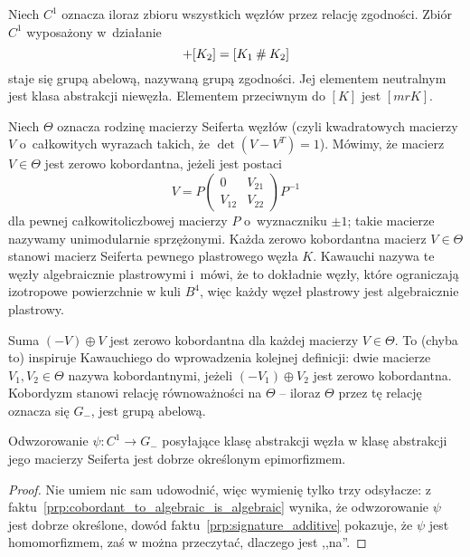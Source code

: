 \begin{definition}
%
    Niech $C^1$ oznacza iloraz zbioru wszystkich węzłów przez relację zgodności.
    Zbiór $C^1$ wyposażony w~działanie
    \begin{equation}
        [K_1] + [K_2] = [K_1 \shrap K_2]
    \end{equation}
    staje się grupą abelową, nazywaną grupą zgodności.
    Jej elementem neutralnym jest klasa abstrakcji niewęzła.
    Elementem przeciwnym do $[K]$ jest $[mr K]$.
\end{definition}


Niech $\Theta$ oznacza rodzinę macierzy Seiferta węzłów (czyli kwadratowych macierzy $V$ o~całkowitych wyrazach takich, że $\det (V - V^T) = 1$).
Mówimy, że macierz $V \in \Theta$ jest zerowo kobordantna, jeżeli jest postaci
\begin{equation}
    V = P \begin{pmatrix} 0 & V_{21} \\ V_{12} & V_{22} \end{pmatrix} P^{-1}
\end{equation}
dla pewnej całkowitoliczbowej macierzy $P$ o~wyznaczniku $\pm 1$; takie macierze nazywamy unimodularnie sprzężonymi.
%
Każda zerowo kobordantna macierz $V \in \Theta$ stanowi macierz Seiferta pewnego plastrowego węzła $K$.
Kawauchi nazywa te węzły algebraicznie plastrowymi i~mówi, że to dokładnie węzły, które ograniczają izotropowe powierzchnie w kuli $B^4$, więc każdy węzeł plastrowy jest algebraicznie plastrowy.

Suma $(-V) \oplus V$ jest zerowo kobordantna dla każdej macierzy $V \in \Theta$.
To (chyba to) inspiruje Kawauchiego do wprowadzenia kolejnej definicji: dwie macierze $V_1, V_2 \in \Theta$ nazywa kobordantnymi, jeżeli $(-V_1) \oplus V_2$ jest zerowo kobordantna.
Kobordyzm stanowi relację równoważności na $\Theta$ -- iloraz $\Theta$ przez tę relację oznacza się $G_-$, jest grupą abelową.

\begin{proposition}
    Odwzorowanie $\psi \colon C^1 \to G_-$ posyłające klasę abstrakcji węzła w klasę abstrakcji jego macierzy Seiferta jest dobrze określonym epimorfizmem.
\end{proposition}

\begin{proof}
    Nie umiem nic sam udowodnić, więc wymienię tylko trzy odsyłacze: z faktu~\ref{prp:cobordant_to_algebraic_is_algebraic} wynika, że odwzorowanie $\psi$ jest dobrze określone, dowód faktu~\ref{prp:signature_additive} pokazuje, że $\psi$ jest homomorfizmem, zaś w \cite[s. 62]{kawauchi1996} można przeczytać, dlaczego jest ,,na''.
\end{proof}

